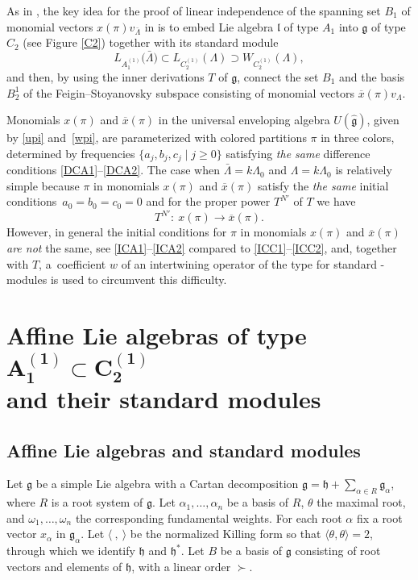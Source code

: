 \documentclass[10pt,a4paper]{amsart}
\newcommand{\g}
{{\mathfrak g}}
\newcommand{\lgg}
{{\mathfrak l}}
\newcommand{\h}
{{\mathfrak h}}
\newcommand{\ox}
{{\overline{x}}}
\numberwithin{equation}{section}
\begin{document}
As in \cite{PT}, the key idea for the proof of linear independence of the spanning set $B_1$ of monomial vectors $x(\pi)v_{\bar\Lambda}$ in  is to embed Lie algebra $\lgg$ of type $A_1$ into ${\mathfrak g}$ of type $C_{2}$ (see Figure \ref{C2}) together with its standard module
\[
L_{A_{1}^{(1)}}\bigl(\bar{\Lambda}\bigr)\subset L_{C_{2}^{(1)}}(\Lambda)
\supset W_{C_{2}^{(1)}}(\Lambda),
\]
and then, by using the inner derivations $T$ of ${\mathfrak g}$, connect the set $B_1$ and
the basis $B_2^1$ of the Feigin--Stoyanovsky subspace  consisting of monomial vectors $\ox(\pi)v_{\Lambda}$.

Monomials $x(\pi)$ and $\ox(\pi)$ in the universal enveloping algebra $U(\hat{\mathfrak g})$, given by \eqref{upi} and~\eqref{wpi}, are parameterized with colored partitions $\pi$ in three colors, determined by frequencies $\{a_j, b_j, c_j\mid j\geq0\}$ satisfying {\it the same} difference conditions \eqref{DCA1}--\eqref{DCA2}. The case when $\bar\Lambda=k\Lambda_0$ and $\Lambda=k\Lambda_0$ is relatively simple because $\pi$ in monomials $x(\pi)$ and $\ox(\pi)$ satisfy the {\it the same} initial conditions~${a_0=b_0=c_0=0}$ and for the proper power $T^{N'}$ of $T$ we have
\[
T^{N'}\colon\ x(\pi)\to \ox(\pi).
\]
However, in general the initial conditions for $\pi$ in monomials $x(\pi)$ and $\ox(\pi)$ {\it are not} the same, see \eqref{ICA1}--\eqref{ICA2} compared to \eqref{ICC1}--\eqref{ICC2}, and, together with $T$, a~coefficient $w$ of an intertwining operator of the type  for standard -modules is used to circumvent this difficulty.

\section[Affine Lie algebras of type A\_1\^(1) C\_2\^(1) and their standard modules]{Affine Lie algebras of type $\boldsymbol{ A_1^{(1)} \subset C_2^{(1)}}$\\ and their standard modules}

\subsection{Affine Lie algebras and standard modules}

Let $\g$ be a simple Lie algebra with a Cartan decomposition $\mathfrak g={\mathfrak h}+\sum_{\alpha\in R} \mathfrak g_\alpha$, where
$R$
 is a root system of $\g$. Let $\alpha_1,\dots, \alpha_n$ be a basis of $R$, $\theta$ the maximal root, and $\omega_1, \dots,\omega_n$ the corresponding fundamental weights. For each root $\alpha$ fix a root vector $x_\alpha$ in $\g_\alpha$.
Let $\langle\ ,\ \rangle$ be the normalized Killing form so that $\langle\theta,\theta\rangle=2$, through which we identify $\h$ and $\h^*$.
Let $B$ be a basis of ${\mathfrak g}$ consisting of root vectors and elements of $\h$, with a linear order $\succ$.
\end{document}
